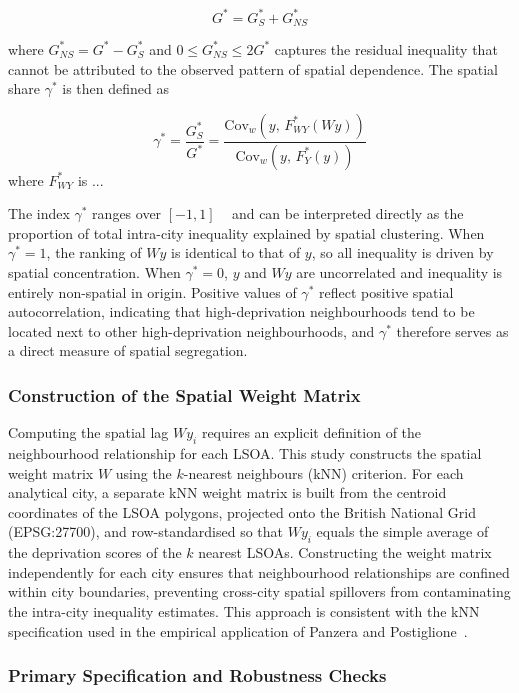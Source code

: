 \documentclass[11pt,journal,compsoc]{IEEEtran}
\begin{document}
$$G^* = G^*_S + G^*_{NS}$$

where $G^*_{NS} = G^* - G^*_S$ and $0 \leq G^*_{NS} \leq 2G^*$ captures the residual inequality that cannot be attributed to the observed pattern of spatial dependence. The spatial share $\gamma^*$ is then defined as ~\cite[Eq.~13]{panzera2020measuring}

$$\gamma^* = \frac{G^*_S}{G^*} = \frac{\text{Cov}_w\!\left(y,\, F^*_{WY}(Wy)\right)}{\text{Cov}_w\!\left(y,\, F^*_Y(y)\right)}$$
where $F^*_{WY}$ is ...

The index $\gamma^*$ ranges over $[-1, 1]$ ~\cite{schechtman1999gini} and can be interpreted directly as the proportion of total intra-city inequality explained by spatial clustering. When $\gamma^* = 1$, the ranking of $Wy$ is identical to that of $y$, so all inequality is driven by spatial concentration. When $\gamma^* = 0$, $y$ and $Wy$ are uncorrelated and inequality is entirely non-spatial in origin. Positive values of $\gamma^*$ reflect positive spatial autocorrelation, indicating that high-deprivation neighbourhoods tend to be located next to other high-deprivation neighbourhoods, and $\gamma^*$ therefore serves as a direct measure of spatial segregation.

\subsubsection{Construction of the Spatial Weight Matrix}

Computing the spatial lag $Wy_i$ requires an explicit definition of the neighbourhood relationship for each LSOA. This study constructs the spatial weight matrix $W$ using the $k$-nearest neighbours (kNN) criterion. For each analytical city, a separate kNN weight matrix is built from the centroid coordinates of the LSOA polygons, projected onto the British National Grid (EPSG:27700), and row-standardised so that $Wy_i$ equals the simple average of the deprivation scores of the $k$ nearest LSOAs. Constructing the weight matrix independently for each city ensures that neighbourhood relationships are confined within city boundaries, preventing cross-city spatial spillovers from contaminating the intra-city inequality estimates. This approach is consistent with the kNN specification used in the empirical application of Panzera and Postiglione~\cite{panzera2020measuring}.

\subsubsection{Primary Specification and Robustness Checks}
\end{document}
